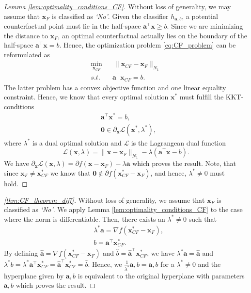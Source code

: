 \documentclass{article}
\begin{document}
{\begin{proof}[Lemma \ref{lem:optimality_conditions_CF}]
Without loss of generality, we may assume that $\bm{x}_F$ is classified as \textit{`No'}. Given the classifier $h_{\bm{a},b}$, a potential counterfactual point must lie in the half-space $\bm{a}^\top \bm{x} \ge b$. Since we are minimizing the distance to $\bm{x}_F$, an optimal counterfactual actually lies on the boundary of the half-space $\bm{a}^\top \bm{x} = b$. Hence, the optimization problem \eqref{eq:CF_problem} can be reformulated as
\begin{equation*}\label{eq:CF_problem_reform}
    \begin{aligned}
    \min_{\bm{x}_{CF}} & \ \| \bm{x}_{CF}-\bm{x}_F\|_{N_1} \\
    s.t. \quad & \bm{a}^\top \bm{x}_{CF} = b .
\end{aligned}
\end{equation*}
The latter problem has a convex objective function and one linear equality constraint. Hence, we know that every optimal solution $\bm{x}^*$ must fulfill the KKT-conditions
\begin{align*}
    &\bm{a}^\top \bm{x}^* = b, \\
    &\bm{0} \in \partial_{\bm{x}}  \mathcal L(\bm{x}^*,\lambda^*),
\end{align*}
where $\lambda^*$ is a dual optimal solution and $\mathcal L$ is the Lagrangean dual function
\[
\mathcal L(\bm{x},\lambda) = \| \bm{x}- \bm{x}_F\|_{N_1} - \lambda (\bm{a}^\top \bm{x} - b).
\]
We have $\partial_{\bm{x}}  \mathcal L(\bm{x},\lambda) = \partial f(\bm{x}-\bm{x}_F) - \lambda \bm{a}$  which proves the result. Note, that since $\bm{x}_F \neq \bm{x}_{CF}^*$ we know that $\bm{0}\notin  \partial  f(\bm{x}_{CF}^* - \bm{x}_F)$, and hence, $\lambda^*\neq 0$ must hold.
\end{proof}

\begin{proof}[\cref{thm:CF_theorem_diff}]
Without loss of generality, we assume that $\bm{x}_F$ is classified as \textit{`No'}. We apply Lemma \ref{lem:optimality_conditions_CF} to the case where the norm is differentiable. Then, there exists an $\lambda^*\neq0$ such that
\begin{align*}
    &\lambda^* \bm{a} = \nabla  f(\bm{x}_{CF}^* - \bm{x}_F),\\
    &b=\bm{a}^\top \bm{x}_{CF}^*. 
\end{align*}
By defining $\hat{\bm{a}}=\nabla  f(\bm{x}_{CF}^* - \bm{x}_F)$ and $\hat{b}=\hat{\bm{a}}^\top \bm{x}_{CF}^*$, we have $\lambda^* \bm{a}=\hat{\bm{a}}$ and $\lambda^* b=\lambda^*\bm{a}^\top \bm{x}_{CF}^*=\hat{\bm{a}}^\top \bm{x}_{CF}^*=\hat{b}$. Hence, we $\frac{1}{\lambda^*}\bm{a},b=\bm{a},b$ for a $\lambda^*\neq 0$ and the hyperplane given by $\bm{a},b$ is equivalent to the original hyperplane with parameters $\bm{a},b$ which proves the result.
\end{proof}

}
\end{document}
